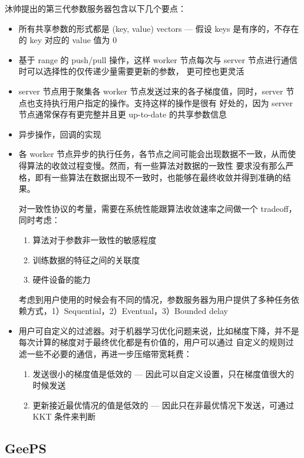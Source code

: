 沐帅提出的第三代参数服务器包含以下几个要点：
\begin{itemize}
	\item 所有共享参数的形式都是 (key, value) vectors --- 假设 keys 是有序的，不存在的 key 对应的 value 值为 0
	\item 基于 range 的 push/pull 操作，这样 worker 节点每次与 server 节点进行通信时可以选择性的仅传递少量需要更新的参数，
	更可控也更灵活
	\item server 节点用于聚集各 worker 节点发送过来的各子梯度值，同时，server 节点也支持执行用户指定的操作。支持这样的操作是很有
	好处的，因为 server 节点通常保存有更完整并且更 up-to-date 的共享参数信息
	\item 异步操作，回调的实现 %
	\item 各 worker 节点异步的执行任务，各节点之间可能会出现数据不一致，从而使得算法的收敛过程变慢。然而，有一些算法对数据的一致性
	要求没有那么严格，即有一些算法在数据出现不一致时，也能够在最终收敛并得到准确的结果。

	对一致性协议的考量，需要在系统性能跟算法收敛速率之间做一个 tradeoff，同时考虑：
	\begin{enumerate}
		\item 算法对于参数非一致性的敏感程度
		\item 训练数据的特征之间的关联度
		\item 硬件设备的能力
	\end{enumerate}

	考虑到用户使用的时候会有不同的情况，参数服务器为用户提供了多种任务依赖方式，1）Sequential，2）Eventual，3）Bounded delay
	\item 用户可自定义的过滤器。对于机器学习优化问题来说，比如梯度下降，并不是每次计算的梯度对于最终优化都是有价值的，用户可以通过
	自定义的规则过滤一些不必要的通信，再进一步压缩带宽耗费：
	\begin{enumerate}
		\item 发送很小的梯度值是低效的 --- 因此可以自定义设置，只在梯度值很大的时候发送
		\item 更新接近最优情况的值是低效的 --- 因此只在非最优情况下发送，可通过 KKT 条件来判断
	\end{enumerate}
\end{itemize}



\subsection{GeePS}\label{paper:geeps}

